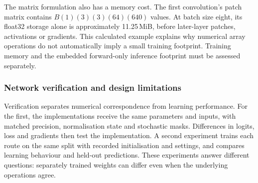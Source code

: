The matrix formulation also has a memory cost. The first convolution's patch matrix contains $B(1)(3)(3)(64)(640)$ values. At batch size eight, its float32 storage alone is approximately 11.25\,MiB, before later-layer patches, activations or gradients. This calculated example explains why numerical array operations do not automatically imply a small training footprint. Training memory and the embedded forward-only inference footprint must be assessed separately.

\subsubsection{Network verification and design limitations}
\label{sec:des-netverify}
Verification separates numerical correspondence from learning performance. For the first, the implementations receive the same parameters and inputs, with matched precision, normalisation state and stochastic masks. Differences in logits, loss and gradients then test the implementation. A second experiment trains each route on the same split with recorded initialisation and settings, and compares learning behaviour and held-out predictions. These experiments answer different questions: separately trained weights can differ even when the underlying operations agree.

